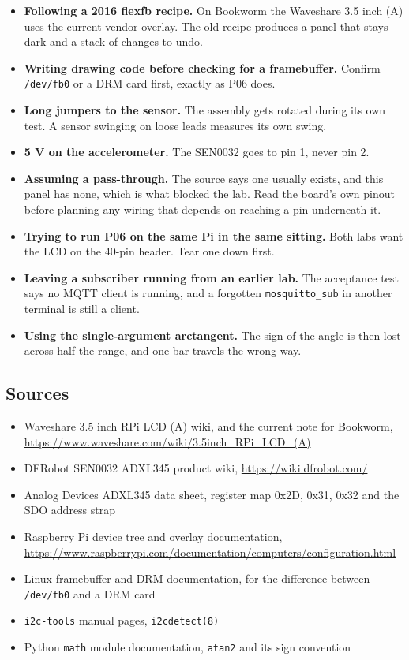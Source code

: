 \begin{itemize}
\item \textbf{Following a 2016 flexfb recipe.} On Bookworm the Waveshare 3.5 inch (A) uses the current vendor overlay. The old recipe produces a panel that stays dark and a stack of changes to undo.
\item \textbf{Writing drawing code before checking for a framebuffer.} Confirm \texttt{/dev/fb0} or a DRM card first, exactly as P06 does.
\item \textbf{Long jumpers to the sensor.} The assembly gets rotated during its own test. A sensor swinging on loose leads measures its own swing.
\item \textbf{5 V on the accelerometer.} The SEN0032 goes to pin 1, never pin 2.
\item \textbf{Assuming a pass-through.} The source says one usually exists, and this panel has none, which is what blocked the lab. Read the board's own pinout before planning any wiring that depends on reaching a pin underneath it.
\item \textbf{Trying to run P06 on the same Pi in the same sitting.} Both labs want the LCD on the 40-pin header. Tear one down first.
\item \textbf{Leaving a subscriber running from an earlier lab.} The acceptance test says no MQTT client is running, and a forgotten \texttt{mosquitto\_sub} in another terminal is still a client.
\item \textbf{Using the single-argument arctangent.} The sign of the angle is then lost across half the range, and one bar travels the wrong way.
\end{itemize}

\subsection*{Sources}

\begin{itemize}
\item Waveshare 3.5 inch RPi LCD (A) wiki, and the current note for Bookworm, \url{https://www.waveshare.com/wiki/3.5inch_RPi_LCD_(A)}
\item DFRobot SEN0032 ADXL345 product wiki, \url{https://wiki.dfrobot.com/}
\item Analog Devices ADXL345 data sheet, register map 0x2D, 0x31, 0x32 and the SDO address strap
\item Raspberry Pi device tree and overlay documentation, \url{https://www.raspberrypi.com/documentation/computers/configuration.html}
\item Linux framebuffer and DRM documentation, for the difference between \texttt{/dev/fb0} and a DRM card
\item \texttt{i2c-tools} manual pages, \texttt{i2cdetect(8)}
\item Python \texttt{math} module documentation, \texttt{atan2} and its sign convention
\end{itemize}
